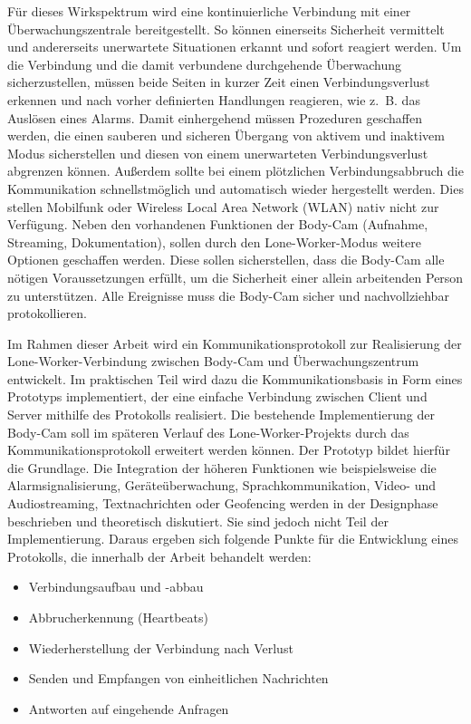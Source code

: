 \documentclass[thesis.tex]{subfiles}
\begin{document}
Für dieses Wirkspektrum wird eine kontinuierliche Verbindung mit einer Überwachungszentrale bereitgestellt.
So können einerseits Sicherheit vermittelt und andererseits unerwartete Situationen erkannt und sofort reagiert werden.
Um die Verbindung und die damit verbundene durchgehende Überwachung sicherzustellen, müssen beide Seiten in kurzer Zeit einen Verbindungsverlust erkennen und nach vorher definierten Handlungen reagieren, wie z.~B. das Auslösen eines Alarms.
Damit einhergehend müssen Prozeduren geschaffen werden, die einen sauberen und sicheren Übergang von aktivem und inaktivem Modus sicherstellen und diesen von einem unerwarteten Verbindungsverlust abgrenzen können.
Außerdem sollte bei einem plötzlichen Verbindungsabbruch die Kommunikation schnellstmöglich und automatisch wieder hergestellt werden.
Dies stellen Mobilfunk oder \glqq Wireless Local Area Network\grqq{} (WLAN) nativ nicht zur Verfügung.
Neben den vorhandenen Funktionen der Body-Cam (Aufnahme, Streaming, Dokumentation), sollen durch den Lone-Worker-Modus weitere Optionen geschaffen werden.
Diese sollen sicherstellen, dass die Body-Cam alle nötigen Voraussetzungen erfüllt, um die Sicherheit einer allein arbeitenden Person zu unterstützen.
Alle Ereignisse muss die Body-Cam sicher und nachvollziehbar protokollieren.

Im Rahmen dieser Arbeit wird ein Kommunikationsprotokoll zur Realisierung der Lone-Worker-Verbindung zwischen Body-Cam und Überwachungszentrum entwickelt.
Im praktischen Teil wird dazu die Kommunikationsbasis in Form eines Prototyps implementiert, der eine einfache Verbindung zwischen Client und Server mithilfe des Protokolls realisiert.
Die bestehende Implementierung der Body-Cam soll im späteren Verlauf des Lone-Worker-Projekts durch das Kommunikationsprotokoll erweitert werden können.
Der Prototyp bildet hierfür die Grundlage.
Die Integration der höheren Funktionen wie beispielsweise die Alarmsignalisierung, Geräteüberwachung, Sprachkommunikation, Video- und Audiostreaming, Textnachrichten oder Geofencing werden in der Designphase beschrieben und theoretisch diskutiert.
Sie sind jedoch nicht Teil der Implementierung.
Daraus ergeben sich folgende Punkte für die Entwicklung eines Protokolls, die innerhalb der Arbeit behandelt werden:
\begin{itemize}
    \item Verbindungsaufbau und -abbau
    \item Abbrucherkennung (Heartbeats)
    \item Wiederherstellung der Verbindung nach Verlust
    \item Senden und Empfangen von einheitlichen Nachrichten
    \item Antworten auf eingehende Anfragen
\end{itemize}
\end{document}
